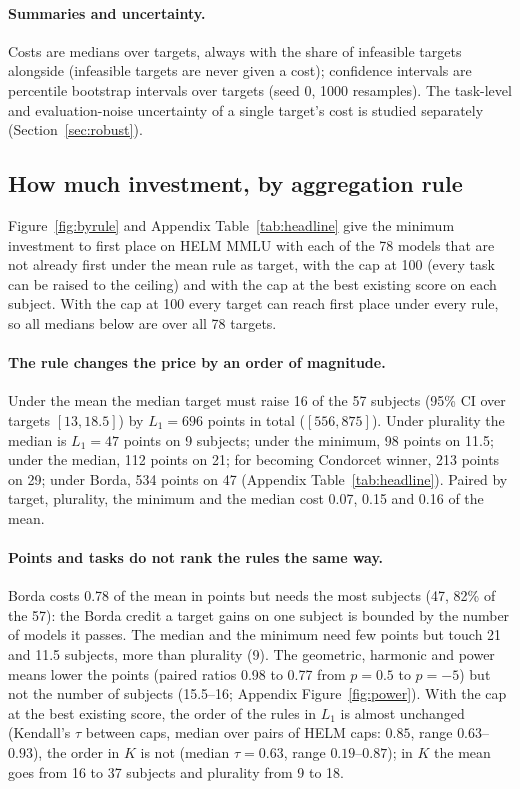 \paragraph{Summaries and uncertainty.}
Costs are medians over targets, always with the share of infeasible targets alongside (infeasible targets are never given a cost); confidence intervals are percentile bootstrap intervals over targets (seed 0, 1000 resamples). The task-level and evaluation-noise uncertainty of a single target's cost is studied separately (Section~\ref{sec:robust}).


\subsection{How much investment, by aggregation rule}
\label{sec:byrule}
Figure~\ref{fig:byrule} and Appendix Table~\ref{tab:headline} give the minimum investment to first place on HELM MMLU with each of the 78 models that are not already first under the mean rule as target, with the cap at 100 (every task can be raised to the ceiling) and with the cap at the best existing score on each subject. With the cap at 100 every target can reach first place under every rule, so all medians below are over all 78 targets.

\paragraph{The rule changes the price by an order of magnitude.}
Under the mean the median target must raise 16 of the 57 subjects (95\% CI over targets $[13,18.5]$) by $L_1=696$ points in total ($[556,875]$). Under plurality the median is $L_1=47$ points on 9 subjects; under the minimum, 98 points on 11.5; under the median, 112 points on 21; for becoming Condorcet winner, 213 points on 29; under Borda, 534 points on 47 (Appendix Table~\ref{tab:headline}). Paired by target, plurality, the minimum and the median cost 0.07, 0.15 and 0.16 of the mean.

\paragraph{Points and tasks do not rank the rules the same way.}
Borda costs 0.78 of the mean in points but needs the most subjects (47, 82\% of the 57): the Borda credit a target gains on one subject is bounded by the number of models it passes. The median and the minimum need few points but touch 21 and 11.5 subjects, more than plurality (9). The geometric, harmonic and power means lower the points (paired ratios 0.98 to 0.77 from $p=0.5$ to $p=-5$) but not the number of subjects (15.5--16; Appendix Figure~\ref{fig:power}). With the cap at the best existing score, the order of the rules in $L_1$ is almost unchanged (Kendall's $\tau$ between caps, median over pairs of HELM caps: $0.85$, range $0.63$--$0.93$), the order in $K$ is not (median $\tau=0.63$, range $0.19$--$0.87$); in $K$ the mean goes from 16 to 37 subjects and plurality from 9 to 18.

